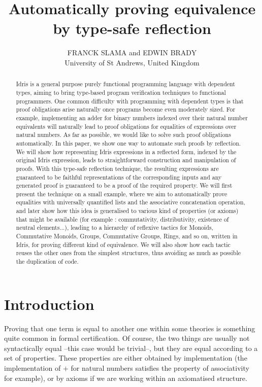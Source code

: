 \documentclass{jfp1}
\title[Automatically proving equivalence by type-safe reflection]
      {Automatically proving equivalence by type-safe reflection}
\author[Franck Slama and Edwin Brady]
        {FRANCK SLAMA and EDWIN BRADY\\
         University of St Andrews, United Kingdom\\
         \email{fs39@st-andrews.ac.uk, ecb10@st-andrews.ac.uk}}
\begin{document}
\label{firstpage}

\maketitle

\begin{abstract}
Idris is a general purpose purely functional programming language with dependent types, aiming to bring type-based program verification techniques to functional programmers. One common difficulty with programming with dependent types is that proof obligations arise naturally once programs become even moderately sized. For example, implementing an adder for binary numbers indexed over their natural number equivalents will naturally lead to proof obligations for equalities of expressions over natural numbers. 
As far as possible, we would like to solve such proof obligations automatically. In this paper, we show one way to automate such proofs by reflection. We will show how representing Idris expressions in a reflected form, indexed by the original Idris expression, leads to straightforward construction and manipulation of proofs.
With this type-safe reflection technique, the resulting expressions are guaranteed to be faithful representations of the corresponding inputs and any generated proof is guaranteed to be a proof of the required property. 
We will first present the technique on a small example, where we aim to automatically prove equalities with universally quantified lists and the associative concatenation operation, and later show how this idea is generalised to various kind of properties (or axioms) that might be available (for example : commutativity, distributivity, existence of neutral elements...), leading to a hierarchy of reflexive tactics for Monoids, Commutative Monoids, Groups, Commutative Groups, Rings, and so on, written in Idris, for proving different kind of equivalence. We will also show how each tactic reuses the other ones from the simplest structures, thus avoiding as much as possible the duplication of code.
\end{abstract}

\tableofcontents

\section{Introduction}

Proving that one term is equal to another one within some theories is something quite common in formal certification. Of course, the two things are usually not syntactically equal --this case would be trivial--, but they are equal according to a set of properties. These properties are either obtained by implementation (the implementation of $+$ for natural numbers satisfies the property of associativity for example), or by axioms if we are working within an axiomatised structure. 
\end{document}
